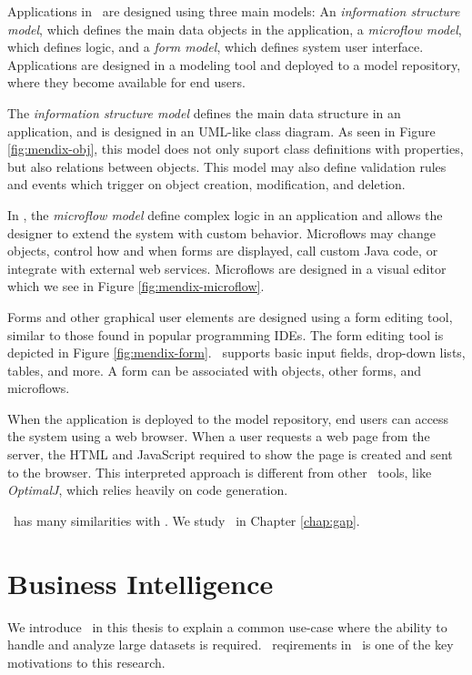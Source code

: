 Applications in \mendix~are designed using three main models: An \textit{information structure model}, which defines the main data objects in the application, a \textit{microflow model}, which defines logic, and a \textit{form model}, which defines system user interface. Applications are designed in a modeling tool and deployed to a model repository, where they become available for end users.

The \textit{information structure model} defines the main data structure in an application, and is designed in an UML-like class diagram. As seen in Figure \ref{fig:mendix-obj}, this model does not only suport class definitions with properties, but also relations between objects. This model may also define validation rules and events which trigger on object creation, modification, and deletion.

In \mendix, the \textit{microflow model} define complex logic in an application and allows the designer to extend the system with custom behavior. Microflows may change objects, control how and when forms are displayed, call custom Java code, or integrate with external web services. Microflows are designed in a visual editor which we see in Figure \ref{fig:mendix-microflow}. 

Forms and other graphical user elements are designed using a form editing tool, similar to those found in popular programming IDEs. The form editing tool is depicted in Figure \ref{fig:mendix-form}. \mendix~supports basic input fields, drop-down lists, tables, and more. A form can be associated with objects, other forms, and microflows. 

When the application is deployed to the model repository, end users can access the system using a web browser. When a user requests a web page from the server, the HTML and JavaScript required to show the page is created and sent to the browser. This interpreted approach is different from other \mde~tools, like \textit{OptimalJ}, which relies heavily on code generation.


\gap~has many similarities with \mendix. We study \gap~in Chapter \ref{chap:gap}.

\section{Business Intelligence}
\label{sec:Business Intelligence}
We introduce \bi~in this thesis to explain a common use-case where the ability to handle and analyze large datasets is required. \bi~reqirements in \gap~is one of the key motivations to this research. 

